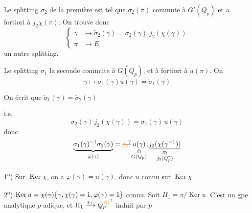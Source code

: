 Le splitting $\sigma_2$ de la première est tel que $\sigma_2(\pi)$ commute à $G'(Q_p)$ et a fortiori à $j_2\chi(\pi)$. On trouve donc
\[
\left\{\begin{aligned}
\gamma&\longmapsto\widetilde{\sigma}_2(\gamma)=\sigma_2(\gamma).j_2(\chi(\gamma))\\
\pi&\longrightarrow E
\end{aligned}\right.
\]
un autre splitting.

Le splitting $\sigma_1$  la seconde commute à $G(Q_p)$, et à fortiori à $u(\pi)$. On 
\[
\gamma\longmapsto\sigma_1(\gamma)u(\gamma)=\widetilde{\sigma}_1(\gamma)
\]

On écrit que $\widetilde{\sigma}_1(\gamma)=\widetilde{\sigma}_2(\gamma)$

i.e.
\[
\sigma_2(\gamma)\,j_2(\chi(\gamma))=\sigma_1(\gamma)\,u(\gamma)
\]
donc
\[
\underbrace{\sigma_1(\gamma)^{-1}\sigma_2(\gamma)}_{\varphi(\gamma)}
=\deleted{\unsure{j_2}}\underset{\substack{\rotatebox{270}{$\in$}\\G(Q_p)}}{u(\gamma)}\mathord{.}
\underset{\substack{\rotatebox{270}{$\in$}\\j_2(Q_p^*)}}{\underline{j_2(\chi(\gamma^{-1}))}}
\]

1\textsuperscript{o}) Sur $\operatorname{Ker}\chi$, on a $\varphi(\gamma)=u(\gamma)$. donc $u$ connu sur $\operatorname{Ker}\chi$

2\textsuperscript{o}) $\operatorname{Ker}u=\deleted{\chi(\gamma)}\{\gamma,\chi(\gamma)=1,\varphi(\gamma)=1\}$ connu. Soit $\Pi_1=\pi/\operatorname{Ker}u$. C'est un gpe analytique $p$-adique, et $\Pi_1\xrightarrow{\chi_1}Q_p^{\unsure{*|1}}$ induit par $p$


